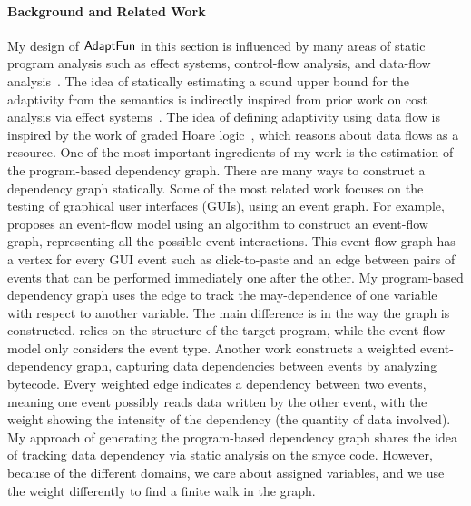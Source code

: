 %
\paragraph*{Background and Related Work} 
My design of $\textsf{AdaptFun}$ in this section is influenced by many areas of static program analysis such as 
effect systems, control-flow analysis, and data-flow analysis~\cite{ryder1988incremental}. 
The idea of statically estimating a sound upper bound for the adaptivity from the semantics is indirectly inspired from prior work on cost analysis via effect systems~\cite{cciccek2017relational,radivcek2017monadic,qu2019relational}. The idea of defining adaptivity using data flow is inspired by the work of graded 
Hoare logic~\cite{gaboardi2021graded}, which reasons about data flows as a resource. 
%
One of the most important ingredients of my work is the estimation of the program-based dependency graph. 
There are many ways to construct a dependency graph statically.
Some of the most related work focuses on the testing of graphical user interfaces (GUIs), using an event graph. For example, \cite{memon2007event} proposes an event-flow model using an algorithm to construct an event-flow graph, representing all the possible event interactions. 
This event-flow graph has a vertex for every GUI event such as click-to-paste and an edge between pairs of events that can be performed immediately one after the other. My program-based dependency graph uses the edge to track the may-dependence of one variable with respect to another variable. 
The main difference is in the way the graph is constructed. {\THESYSTEM} relies on the structure of the target program, while the event-flow model only considers the event type. 
Another work \cite{arlt2012lightweight} constructs a weighted event-dependency graph, capturing data dependencies between events by analyzing bytecode. 
Every weighted edge indicates a dependency between two events, meaning one event possibly reads data written by the other event, with the weight showing the intensity of the dependency (the quantity of data involved). 
My approach of generating the program-based dependency graph shares the idea of tracking data dependency via static analysis on the smyce code. 
However, because of the different domains, we care about assigned variables, and we use the weight differently to find a finite walk in the graph.
